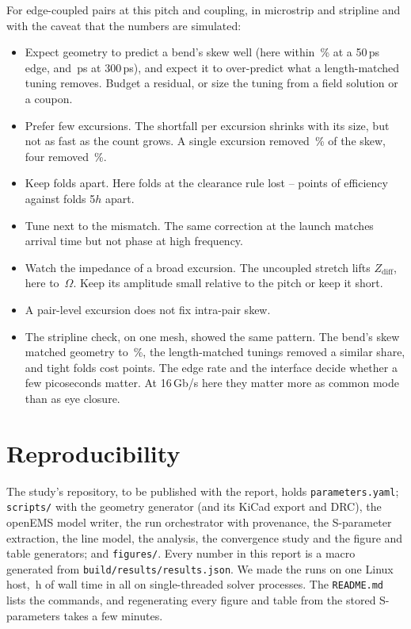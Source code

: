 For edge-coupled pairs at this pitch and coupling, in microstrip and stripline and with the caveat that the
numbers are simulated:
\begin{itemize}\itemsep 1pt
\item Expect geometry to predict a bend's skew well (here within \BendErrPct\,\% at a 50\,ps edge, and
\SkewBRdaa\,ps at 300\,ps), and expect it to over-predict what a
length-matched tuning removes. Budget a residual, or size the tuning from a field solution or a coupon.
\item Prefer few excursions. The shortfall per excursion shrinks with its size, but not as fast as the count
grows. A single excursion removed \RemovedPctF\,\% of the skew, four removed \RemovedPctD\,\%.
\item Keep folds apart. Here folds at the clearance rule lost \FoldPenMin--\FoldPenMax{} points of efficiency
against folds
5$h$ apart.
\item Tune next to the mismatch. The same correction at the launch matches arrival time but not phase at high
frequency.
\item Watch the impedance of a broad excursion. The uncoupled stretch lifts $Z_\mathrm{diff}$, here to
\ZmaxF\,$\Omega$. Keep its amplitude small relative to the pitch or keep it short.
\item A pair-level excursion does not fix intra-pair skew.
\item The stripline check, on one mesh, showed the same pattern. The bend's skew matched geometry to
\BendErrPctSl\,\%, the length-matched tunings removed a similar share, and tight folds cost \FoldPenaltySl{} points. The edge rate and the interface decide whether a few
picoseconds matter. At 16\,Gb/s here they matter more as common mode than as eye closure.
\end{itemize}

\section{Reproducibility}
\label{sec:repro}

The study's repository, to be published with the report, holds \texttt{parameters.yaml}; \texttt{scripts/} with the geometry generator (and its KiCad
export and DRC), the openEMS model writer, the run orchestrator with provenance, the S-parameter extraction, the
line model, the analysis, the convergence study and the figure and table generators; and \texttt{figures/}. Every
number in this report is a macro generated from \texttt{build/results/results.json}. We made the \RunCount{} runs on one
Linux host, \RunHours\,h of wall time in all on single-threaded solver processes. The
\texttt{README.md} lists the commands, and regenerating every figure and table from the stored S-parameters takes a
few minutes.

